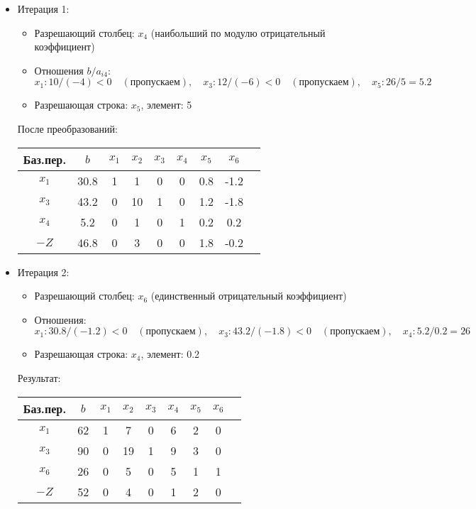 \documentclass{report}
\begin{document}
\begin{enumerate}
\begin{itemize}
			\item Итерация 1:
			\begin{itemize}
				\item Разрешающий столбец: $x_4$ (наибольший по модулю отрицательный коэффициент)
				\item Отношения $b/a_{i4}$:
				\[
				x_1: 10/(-4) < 0 \quad (\text{пропускаем}), \quad
				x_3: 12/(-6) < 0 \quad (\text{пропускаем}), \quad
				x_5: 26/5 = 5.2
				\]
				\item Разрешающая строка: $x_5$, элемент: 5
			\end{itemize}
			
			После преобразований:
			\begin{center}
				\begin{tabular}{ccccccccc}
					\toprule
					Баз.пер. & $b$ & $x_1$ & $x_2$ & $x_3$ & $x_4$ & $x_5$ & $x_6$ \\
					\midrule
					$x_1$    & 30.8 & 1     & 1     & 0     & 0     & 0.8   & -1.2  \\
					$x_3$    & 43.2 & 0     & 10    & 1     & 0     & 1.2   & -1.8  \\
					$x_4$    & 5.2  & 0     & 1     & 0     & 1     & 0.2   & 0.2   \\
					$-Z$     & 46.8 & 0     & 3     & 0     & 0     & 1.8   & -0.2  \\
					\bottomrule
				\end{tabular}
			\end{center}
			
			\item Итерация 2:
			\begin{itemize}
				\item Разрешающий столбец: $x_6$ (единственный отрицательный коэффициент)
				\item Отношения:
				\[
				x_1: 30.8/(-1.2) < 0 \quad (\text{пропускаем}), \quad
				x_3: 43.2/(-1.8) < 0 \quad (\text{пропускаем}), \quad
				x_4: 5.2/0.2 = 26
				\]
				\item Разрешающая строка: $x_4$, элемент: 0.2
			\end{itemize}
			
			Результат:
			\begin{center}
				\begin{tabular}{ccccccccc}
					\toprule
					Баз.пер. & $b$ & $x_1$ & $x_2$ & $x_3$ & $x_4$ & $x_5$ & $x_6$ \\
					\midrule
					$x_1$    & 62   & 1     & 7     & 0     & 6     & 2     & 0     \\
					$x_3$    & 90   & 0     & 19    & 1     & 9     & 3     & 0     \\
					$x_6$    & 26   & 0     & 5     & 0     & 5     & 1     & 1     \\
					$-Z$     & 52   & 0     & 4     & 0     & 1     & 2     & 0     \\
					\bottomrule
				\end{tabular}
			\end{center}
			

\end{itemize}
\end{enumerate}
\end{document}
